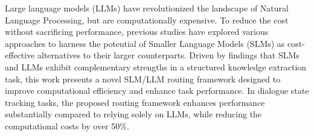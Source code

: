Large language models (LLMs) have revolutionized the landscape of Natural Language Processing, but are computationally expensive. To reduce the cost without sacrificing performance, previous studies have explored various approaches to harness the potential of Smaller Language Models (SLMs) as cost-effective alternatives to their larger counterparts. Driven by findings that SLMs and LLMs exhibit complementary strengths in a structured knowledge extraction task, this work presents a novel SLM/LLM routing framework designed to improve computational efficiency and enhance task performance. In dialogue state tracking tasks, the proposed routing framework enhances performance substantially compared to relying solely on LLMs, while reducing the computational costs by over 50\%.